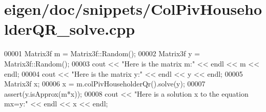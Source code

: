 \hypertarget{eigen_2doc_2snippets_2_col_piv_householder_q_r__solve_8cpp_source}{}\section{eigen/doc/snippets/\+Col\+Piv\+Householder\+Q\+R\+\_\+solve.cpp}
\label{eigen_2doc_2snippets_2_col_piv_householder_q_r__solve_8cpp_source}

\begin{DoxyCode}
00001 Matrix3f m = Matrix3f::Random();
00002 Matrix3f y = Matrix3f::Random();
00003 cout << \textcolor{stringliteral}{"Here is the matrix m:"} << endl << m << endl;
00004 cout << \textcolor{stringliteral}{"Here is the matrix y:"} << endl << y << endl;
00005 Matrix3f x;
00006 x = m.colPivHouseholderQr().solve(y);
00007 assert(y.isApprox(m*x));
00008 cout << \textcolor{stringliteral}{"Here is a solution x to the equation mx=y:"} << endl << x << endl;
\end{DoxyCode}
